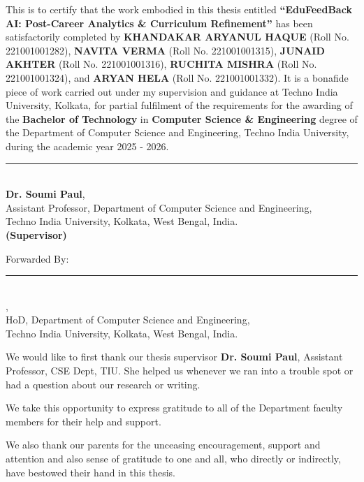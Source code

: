 \documentclass[oneside]{ecsproject}     %
\begin{document}
\begin{certificate}
This is to certify that the work embodied in this thesis entitled \textbf{``EduFeedBack AI: Post-Career Analytics \& Curriculum Refinement''} has been satisfactorily completed by \textbf{KHANDAKAR ARYANUL HAQUE} (Roll No. 221001001282), \textbf{NAVITA VERMA} (Roll No. 221001001315), \textbf{JUNAID AKHTER} (Roll No. 221001001316), \textbf{RUCHITA MISHRA} (Roll No. 221001001324), and \textbf{ARYAN HELA} (Roll No. 221001001332). It is a bonafide piece of work carried out under my supervision and guidance at Techno India University, Kolkata, for partial fulfilment of the requirements for the awarding of the \textbf{Bachelor of Technology} in \textbf{Computer Science \& Engineering} degree of the Department of Computer Science and Engineering, Techno India University, during the academic year 2025 - 2026.

\vspace{2cm}

\begin{flushright}
\rule{8cm}{0.4pt} \\
\textbf{Dr. Soumi Paul}, \\
Assistant Professor, Department of Computer Science and Engineering, \\
Techno India University, Kolkata, West Bengal, India. \\
\textbf{(Supervisor)}
\end{flushright}

\vspace{1cm}

\begin{flushleft}
Forwarded By: \\[2cm]
\rule{8cm}{0.4pt} \\
\textbf{}, \\
HoD, Department of Computer Science and Engineering, \\
Techno India University, Kolkata, West Bengal, India.
\end{flushleft}
\end{certificate}


\begin{acknowledgement}
We would like to first thank our thesis supervisor \textbf{Dr. Soumi Paul}, Assistant Professor, CSE Dept, TIU. She helped us whenever we ran into a trouble spot or had a question about our research or writing. 

We take this opportunity to express gratitude to all of the Department faculty members for their help and support. 

We also thank our parents for the unceasing encouragement, support and attention and also sense of gratitude to one and all, who directly or indirectly, have bestowed their hand in this thesis.
\end{acknowledgement}
\end{document}
